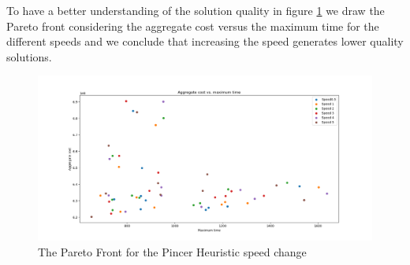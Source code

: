 To have a better understanding of the solution quality in figure \ref{fig:costTimeSpeed} we draw the Pareto front considering the aggregate cost versus the maximum time for the different speeds and we conclude that increasing the speed generates lower quality solutions.

	\begin{figure}[h!]
		\centering
		\includegraphics[width=\textwidth]{figures/costTimeSpeed.png}
		\caption[]{The Pareto Front for the Pincer Heuristic speed change}
		\label{fig:costTimeSpeed}
	\end{figure}


